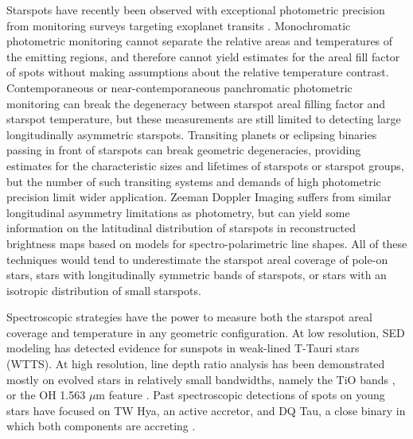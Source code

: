 \documentclass[12pt]{report}
\begin{document}


Starspots have recently been observed with exceptional photometric precision from monitoring surveys targeting exoplanet transits \citep[\emph{e.g}][]{harrison11,davenport15}.  Monochromatic photometric monitoring cannot separate the relative areas and temperatures of the emitting regions, and therefore cannot yield estimates for the areal fill factor of spots without making assumptions about the relative temperature contrast. Contemporaneous or near-contemporaneous panchromatic photometric monitoring \citep{petrov94,bouvier95,grankin07,cody14} can break the degeneracy between starspot areal filling factor and starspot temperature, but these measurements are still limited to detecting large longitudinally asymmetric starspots.  Transiting planets or eclipsing binaries passing in front of starspots \citep{desert11} can break geometric degeneracies, providing estimates for the characteristic sizes and lifetimes of starspots or starspot groups, but the number of such transiting systems and demands of high photometric precision limit wider application.  Zeeman Doppler Imaging \citep[ZDI]{donati14} suffers from similar longitudinal asymmetry limitations as photometry, but can yield some information on the latitudinal distribution of starspots in reconstructed brightness maps based on models for spectro-polarimetric line shapes.  All of these techniques would tend to underestimate the starspot areal coverage of pole-on stars, stars with longitudinally symmetric bands of starspots, or stars with an isotropic distribution of small starspots.  

Spectroscopic strategies have the power to measure both the starspot areal coverage and temperature in any geometric configuration.  At low resolution, SED modeling \citep{wolk96} has detected evidence for sunspots in weak-lined T-Tauri stars (WTTS).  At high resolution, line depth ratio analysis has been demonstrated mostly on evolved stars in relatively small bandwidths, namely the TiO bands \citep{neff95,oneal96,oneal98,oneal04}, or the OH 1.563 $\mu$m feature \citep{oneal01}.  Past spectroscopic detections of spots on young stars have focused on TW Hya, an active accretor, and DQ Tau, a close binary in which both components are accreting \citep{debes13,bary14}.  
\end{document}
